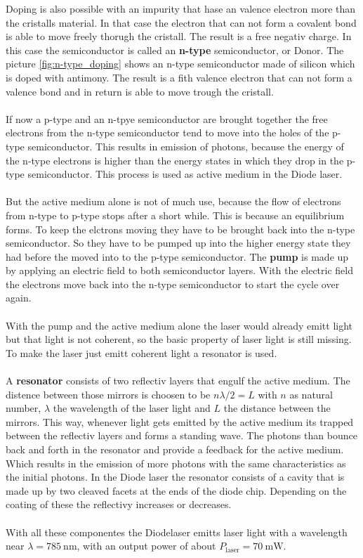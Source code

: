 Doping is also possible with an impurity that hase an valence electron more than the cristalls material.
In that case the electron that can not form a covalent bond is able to move freely thorugh the cristall.
The result is a free negativ charge. In this case the semiconductor is called an \textbf{n-type} semiconductor, or Donor.
The picture \ref{fig:n-type_doping} shows an n-type semiconductor made of silicon which is doped with antimony.
The result is a fith valence electron that can not form a valence bond and in return is able to move trough the cristall.
\\\\
\FloatBarrier
If now a p-type and an n-tpye semiconductor are brought together the free electrons from the n-type semiconductor tend to move into the holes of the p-type semiconductor.
This results in emission of photons, because the energy of the n-type electrons is higher than the energy states in which they drop in the p-type semiconductor.
This process is used as active medium in the Diode laser.
\\\\
But the active medium alone is not of much use, because the flow of electrons from n-type to p-type stops after a short while.
This is because an equilibrium forms.
To keep the elctrons moving they have to be brought back into the n-type semiconductor.
So they have to be pumped up into the higher energy state they had before the moved into to the p-type semiconductor.
The \textbf{pump} is made up by applying an electric field to both semiconductor layers.
With the electric field the electrons move back into the n-type semiconductor to start the cycle over again.
\\\\
With the pump and the active medium alone the laser would already emitt light but that light is not coherent, so the basic property of laser light is still missing.
To make the laser just emitt coherent light a resonator is used.
\\\\
A \textbf{resonator} consists of two reflectiv layers that engulf the active medium.
The distence between those mirrors is choosen to be $n \lambda/2 = L$ with $n$ as natural number, $\lambda$ the wavelength of the laser light and $L$ the distance between the mirrors.
This way, whenever light gets emitted by the active medium its trapped between the reflectiv layers and forms a standing wave.
The photons than bounce back and forth in the resonator and provide a feedback for the active medium.
Which results in the emission of more photons with the same characteristics as the initial photons.
In the Diode laser the resonator consists of a cavity that is made up by two cleaved facets at the ends of the diode chip.
Depending on the coating of these the reflectivy increases or decreases.
\\\\
With all these componentes the Diodelaser emitts laser light with a wavelength near $\lambda = \SI{785}{\nano\meter}$, with an output power of about $P_\text{laser} = \SI{70}{\milli\W}$.

